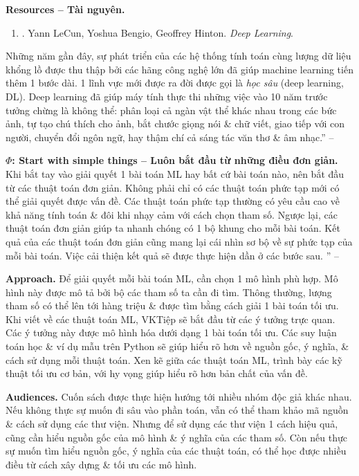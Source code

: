 \documentclass{article}
\begin{document}
\noindent\textbf{\textsf{Resources -- Tài nguyên.}}
\begin{enumerate}
	\item \cite{LeCun_Bengio_Hinton2015}. {\sc Yann LeCun, Yoshua Bengio, Geoffrey Hinton}. {\it Deep Learning}.
\end{enumerate}
Những năm gần đây, sự phát triển của các hệ thống tính toán cùng lượng dữ liệu khổng lồ được thu thập bởi các hãng công nghệ lớn đã giúp machine learning tiến thêm 1 bước dài. 1 lĩnh vực mới được ra đời được gọi là {\it học sâu} (deep learning, DL). Deep learning đã giúp máy tính thực thi những việc vào 10 năm trước tưởng chừng là không thể: phân loại cả ngàn vật thể khác nhau trong các bức ảnh, tự tạo chú thích cho ảnh, bắt chước giọng nói \& chữ viết, giao tiếp với con người, chuyển đổi ngôn ngữ, hay thậm chí cả sáng tác văn thơ \& âm nhạc.'' -- \cite[p. 15]{Tiep_ML_co_ban}

{\bf$\Phi$: Start with simple things -- Luôn bắt đầu từ những điều đơn giản.} Khi bắt tay vào giải quyết 1 bài toán ML hay bất cứ bài toán nào, nên bắt đầu từ các thuật toán đơn giản. Không phải chỉ có các thuật toán phức tạp mới có thể giải quyết được vấn đề. Các thuật toán phức tạp thường có yêu cầu cao về khả năng tính toán \& đôi khi nhạy cảm với cách chọn tham số. Ngược lại, các thuật toán đơn giản giúp ta nhanh chóng có 1 bộ khung cho mỗi bài toán. Kết quả của các thuật toán đơn giản cũng mang lại cái nhìn sơ bộ về sự phức tạp của mỗi bài toán. Việc cải thiện kết quả sẽ được thực hiện dần ở các bước sau. '' -- \cite[p. 17]{Tiep_ML_co_ban}

{\bf Approach.} Để giải quyết mỗi bài toán ML, cần chọn 1 mô hình phù hợp. Mô hình này được mô tả bởi bộ các tham số ta cần đi tìm. Thông thường, lượng tham số có thể lên tới hàng triệu \& được tìm bằng cách giải 1 bài toán tối ưu. Khi viết về các thuật toán ML, VKTiệp sẽ bắt đầu từ các ý tưởng trực quan. Các ý tưởng này được mô hình hóa dưới dạng 1 bài toán tối ưu. Các suy luận toán học \& ví dụ mẫu trên Python sẽ giúp hiểu rõ hơn về nguồn gốc, ý nghĩa, \& cách sử dụng mỗi thuật toán. Xen kẽ giữa các thuật toán ML, trình bày các kỹ thuật tối ưu cơ bản, với hy vọng giúp hiểu rõ hơn bản chất của vấn đề.

{\bf Audiences.} Cuốn sách được thực hiện hướng tới nhiều nhóm độc giả khác nhau. Nếu không thực sự muốn đi sâu vào phần toán, vẫn có thể tham khảo mã nguồn \& cách sử dụng các thư viện. Nhưng để sử dụng các thư viện 1 cách hiệu quả, cũng cần hiểu nguồn gốc của mô hình \& ý nghĩa của các tham số. Còn nếu thực sự muốn tìm hiểu nguồn gốc, ý nghĩa của các thuật toán, có thể học được nhiều điều từ cách xây dựng \& tối ưu các mô hình.
\end{document}

